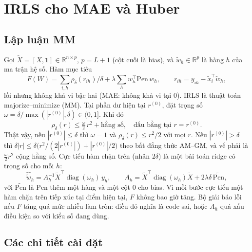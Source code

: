 \section{IRLS cho MAE và Huber}
\label{app:irls}

\subsection{Lập luận MM}

Gọi $\tilde X = [X, \mathbf 1] \in \mathbb{R}^{n \times p}$, $p = L + 1$ (cột cuối là bias), và $\tilde w_h \in \mathbb{R}^p$ là hàng $h$ của ma trận hệ số. Hàm mục tiêu
\begin{equation}
    F(W) = \sum_{i,h} \rho_\delta(r_{ih})/\delta + \lambda \sum_h w_h^\top \mathrm{Pen}\, w_h, \qquad r_{ih} = y_{ih} - \tilde x_i^\top \tilde w_h,
\end{equation}
lồi nhưng không khả vi bậc hai (MAE: không khả vi tại $0$). IRLS là thuật toán majorize--minimize (MM). Tại phần dư hiện tại $r^{(0)}$, đặt trọng số $\omega = \delta / \max(|r^{(0)}|, \delta) \in (0, 1]$. Khi đó
\begin{equation}
    \rho_\delta(r) \le \tfrac{\omega}{2}\, r^2 + \text{hằng số}, \quad \text{dấu bằng tại } r = r^{(0)}.
\end{equation}
Thật vậy, nếu $|r^{(0)}| \le \delta$ thì $\omega = 1$ và $\rho_\delta(r) \le r^2/2$ với mọi $r$. Nếu $|r^{(0)}| > \delta$ thì $\delta|r| \le \delta\bigl(r^2/(2|r^{(0)}|) + |r^{(0)}|/2\bigr)$ theo bất đẳng thức AM--GM, và vế phải là $\tfrac{\omega}{2} r^2$ cộng hằng số. Cực tiểu hàm chặn trên (nhân $2\delta$) là một bài toán ridge có trọng số cho mỗi $h$:
\begin{equation}
    \hat{\tilde w}_h = A_h^{-1} \tilde X^\top \operatorname{diag}(\omega_h)\, y_h, \qquad A_h = \tilde X^\top \operatorname{diag}(\omega_h) \tilde X + 2\lambda\delta\, \widetilde{\mathrm{Pen}},
\end{equation}
với $\widetilde{\mathrm{Pen}}$ là $\mathrm{Pen}$ thêm một hàng và một cột $0$ cho bias. Vì mỗi bước cực tiểu một hàm chặn trên tiếp xúc tại điểm hiện tại, $F$ không bao giờ tăng. Bộ giải báo lỗi nếu $F$ tăng quá mức nhiễu làm tròn: điều đó nghĩa là code sai, hoặc $A_h$ quá xấu điều kiện so với kiểu số đang dùng.

\subsection{Các chi tiết cài đặt}

